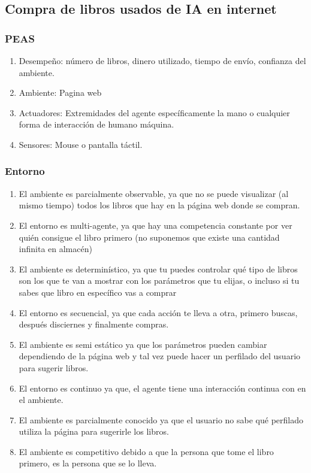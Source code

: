 \documentclass{article}
\begin{document}
        \subsection{Compra de libros usados de IA en internet}
            \subsubsection{PEAS}
                \begin{enumerate}
                    \item Desempeño: número de libros, dinero utilizado, tiempo de envío, confianza del ambiente.
                    \item Ambiente: Pagina web
                    \item Actuadores: Extremidades del agente específicamente la mano o cualquier forma de interacción de humano máquina.
                    \item Sensores: Mouse o pantalla táctil.
                \end{enumerate}
            
            \subsubsection{Entorno}
                \begin{enumerate}
                    \item El ambiente es parcialmente observable, ya que no se puede visualizar (al mismo tiempo) todos los libros que hay en la página web donde se compran.
                    \item El entorno es multi-agente, ya que hay una competencia constante por ver quién consigue el libro primero (no suponemos que existe una cantidad infinita en almacén)
                    \item El ambiente es determinístico, ya que tu puedes controlar qué tipo de libros son los que te van a mostrar con los parámetros que tu elijas, o incluso si tu sabes que libro en específico vas a comprar
                    \item El entorno es secuencial, ya que cada acción te lleva a otra, primero buscas, después disciernes y finalmente compras.
                    \item El ambiente es semi estático ya que los parámetros pueden cambiar dependiendo de la página web y tal vez puede hacer un perfilado del usuario para sugerir libros.
                    \item El entorno es continuo ya que, el agente tiene una interacción continua con en el ambiente.
                    \item El ambiente es parcialmente conocido ya que el usuario no sabe qué perfilado utiliza la página para sugerirle los libros.
                    \item El ambiente es competitivo debido a que la persona que tome el libro primero, es la persona que se lo lleva.
                \end{enumerate}
            
\end{document}

